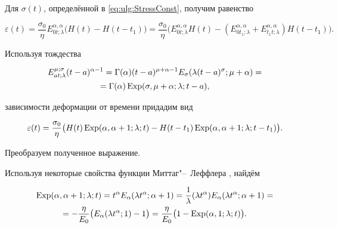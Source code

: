 Для $\sigma(t)$, определённой в \eqref{eq:ulg:StressConst}, получим равенство

\begin{equation*}

\varepsilon(t)=\frac{\sigma_{0}}{\eta}E_{0t;\lambda}^{\alpha,\alpha}

\bigl(H(t)-H(t-t_{1})\bigr)=\frac{\sigma_{0}}{\eta}

\bigl(E_{0t;\lambda}^{\alpha,\alpha}H(t)-(E_{0t_{1};\lambda}^{\alpha,\alpha}+E_{t_{1}t;\lambda}^{\alpha,\alpha})H(t-t_{1})\bigr).  \end{equation*}

Используя тождества \cite{ulg:bib:OY_some_properties_operators}

\begin{multline}

E_{at;\lambda}^{\mu;\sigma}(t-a)^{\alpha-1}=\Gamma(\alpha)(t-a)^{\mu+\alpha-1} E_{\sigma}(\lambda (t-a)^{\sigma};\mu+\alpha)= \\ =\Gamma (\alpha)  \mathop{\rm Exp}\nolimits  (\sigma,\mu+\alpha;\lambda;t-a),

\end{multline}

зависимости деформации от времени придадим вид

\begin{equation*}

\varepsilon(t)=\frac{\sigma_{0}}{\eta}\bigl( H(t)  \mathop{\rm Exp}\nolimits  (\alpha,\alpha+1;\lambda;t)-H(t-t_{1})  \mathop{\rm Exp}\nolimits  (\alpha,\alpha+1;\lambda;t-t_{1})\bigr).

\end{equation*}





Преобразуем полученное выражение. 

Используя некоторые свойства функции Миттаг"--~Леффлера \cite{ulg:bib:Djrbashyan1966}, найдём

\begin{multline*}

  \mathop{\rm Exp}\nolimits  (\alpha,\alpha+1;\lambda;t)=t^{\alpha}E_{\alpha}(\lambda

t^{\alpha};\alpha+1)=\frac{1}{\lambda}(\lambda

t^{\alpha})E_{\alpha}(\lambda

t^{\alpha};\alpha+1)=\\

=-\frac{\eta}{E_{0}}\bigl(E_{\alpha}(\lambda

t^{\alpha};1)-1\bigr)=\frac{\eta}{E_{0}}\bigl(1-  \mathop{\rm Exp}\nolimits  (\alpha,1;\lambda;t)\bigr).

\end{multline*}

